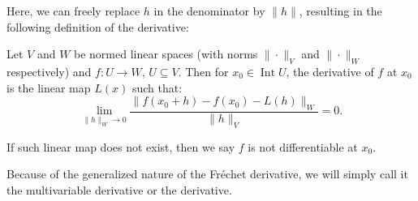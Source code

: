 Here, we can freely replace \( h \) in the denominator by \( \|h\| \), resulting
in the following definition of the derivative:
\begin{definition}
\label{def:Fréchet derivative}
  Let \( V \) and \( W \) be normed linear spaces (with norms \( \|\cdot\|_{V} \)
  and \( \|\cdot\|_{W} \) respectively) and \( f: U \to W \), \( U \subseteq V
  \). Then for \( x_{0} \in \operatorname{Int} U \), the derivative of \( f \)
  at \( x_{0} \) is the linear map \( L(x) \) such that:
  \[
    \lim_{\|h\|_{W} \to 0} \frac{\|f(x_{0} + h) - f(x_{0}) -
    L(h)\|_{W}}{\|h\|_{V}}  = 0
  .\] 

  If such linear map does not exist, then we say \( f \) is not differentiable
  at \( x_{0} \).
\end{definition}

Because of the generalized nature of the Fréchet derivative, we will simply call
it the multivariable derivative or the derivative.

